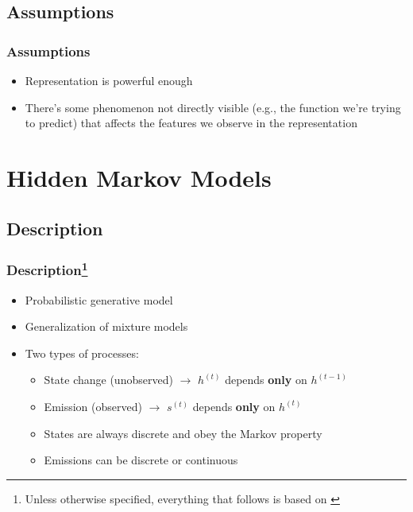 \documentclass[11pt]{beamer}
\begin{document}
    \subsection{Assumptions}
    \begin{frame}
        \frametitle{Assumptions}
        \begin{itemize}
            \item Representation is powerful enough
            \item There's some phenomenon not directly visible (e.g., the function we're trying to predict) that affects the features we observe in the representation
        \end{itemize}
    \end{frame}
    
    \section{Hidden Markov Models}
    \subsection{Description}
    \begin{frame}
        \frametitle{Description\footnote{Unless otherwise specified, everything that follows is based on \cite{cristianini2006introduction}}}
        \begin{itemize}
            \item Probabilistic generative model
            \item Generalization of mixture models
            \item Two types of processes:
            \begin{itemize}
                \item State change (unobserved) $\rightarrow$ $h^{(t)}$ depends \textbf{only} on $h^{(t-1)}$
                \item Emission (observed) $\rightarrow$ $s^{(t)}$ depends \textbf{only} on $h^{(t)}$
                \item States are always discrete and obey the Markov property
                \item Emissions can be discrete or continuous
            \end{itemize}
        \end{itemize}
    \end{frame}
\end{document}
